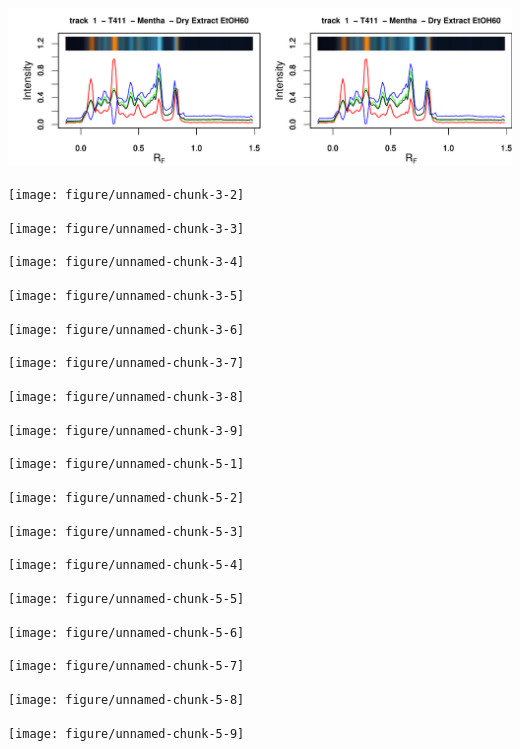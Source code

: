 \documentclass[a4paper]{article}\usepackage[]{graphicx}\usepackage[]{color}
\makeatletter
\def\maxwidth{ %
  \ifdim\Gin@nat@width>\linewidth
    \linewidth
  \else
    \Gin@nat@width
  \fi
}
\newenvironment{knitrout}{}{} %
\makeatother
\begin{document}











\begin{knitrout}
\color{fgcolor}
\includegraphics[width=\maxwidth]{figure/unnamed-chunk-3-1} 

\texttt{[image: figure/unnamed-chunk-3-2]} 

\texttt{[image: figure/unnamed-chunk-3-3]} 

\texttt{[image: figure/unnamed-chunk-3-4]} 

\texttt{[image: figure/unnamed-chunk-3-5]} 

\texttt{[image: figure/unnamed-chunk-3-6]} 

\texttt{[image: figure/unnamed-chunk-3-7]} 

\texttt{[image: figure/unnamed-chunk-3-8]} 

\texttt{[image: figure/unnamed-chunk-3-9]} 

\end{knitrout}




\texttt{[image: figure/unnamed-chunk-5-1]} 

\texttt{[image: figure/unnamed-chunk-5-2]} 

\texttt{[image: figure/unnamed-chunk-5-3]} 

\texttt{[image: figure/unnamed-chunk-5-4]} 

\texttt{[image: figure/unnamed-chunk-5-5]} 

\texttt{[image: figure/unnamed-chunk-5-6]} 

\texttt{[image: figure/unnamed-chunk-5-7]} 

\texttt{[image: figure/unnamed-chunk-5-8]} 

\texttt{[image: figure/unnamed-chunk-5-9]} 
\end{document}

